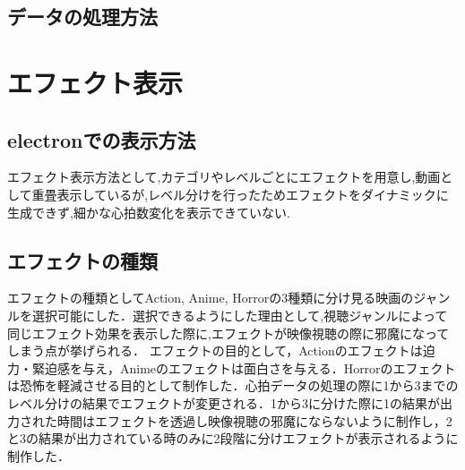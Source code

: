 \subsection{データの処理方法}

\section{エフェクト表示}



\subsection{electronでの表示方法}


エフェクト表示方法として,カテゴリやレベルごとにエフェクトを用意し,動画として重畳表示しているが,レベル分けを行ったためエフェクトをダイナミックに生成できず,細かな心拍数変化を表示できていない.


\subsection{エフェクトの種類}

エフェクトの種類としてAction, Anime, Horrorの3種類に分け見る映画のジャンルを選択可能にした．選択できるようにした理由として,視聴ジャンルによって同じエフェクト効果を表示した際に,エフェクトが映像視聴の際に邪魔になってしまう点が挙げられる．
エフェクトの目的として，Actionのエフェクトは迫力・緊迫感を与え，Animeのエフェクトは面白さを与える．Horrorのエフェクトは恐怖を軽減させる目的として制作した．心拍データの処理の際に1から3までのレベル分けの結果でエフェクトが変更される．1から3に分けた際に1の結果が出力された時間はエフェクトを透過し映像視聴の邪魔にならないように制作し，2と3の結果が出力されている時のみに2段階に分けエフェクトが表示されるように制作した．